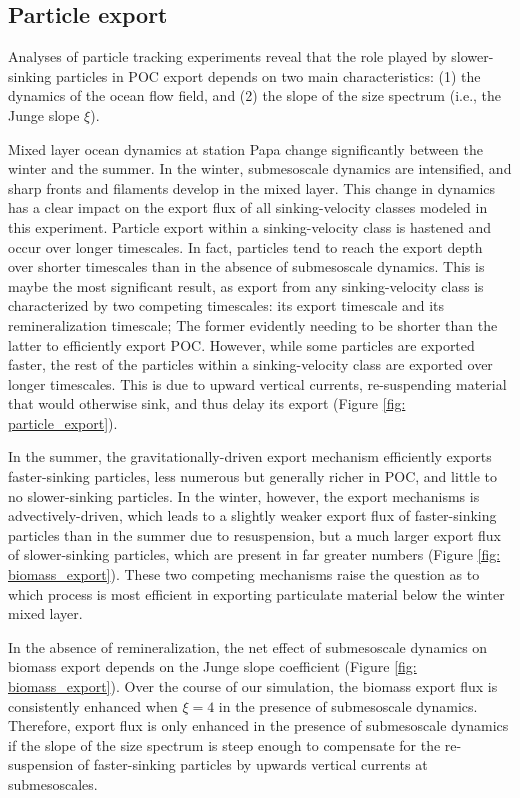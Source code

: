\documentclass[draft,linenumbers]{agujournal2018}
\begin{document}
\subsection{Particle export}
\label{sec: discussion_particle}

Analyses of particle tracking experiments reveal that the role played by slower-sinking particles in POC export depends on two main characteristics: (1) the dynamics of the ocean flow field, and (2) the slope of the size spectrum (i.e., the Junge slope $\xi$).

Mixed layer ocean dynamics at station Papa change significantly between the winter and the summer. In the winter, submesoscale dynamics are intensified, and sharp fronts and filaments develop in the mixed layer. This change in dynamics has a clear impact on the export flux of all sinking-velocity classes modeled in this experiment. Particle export within a sinking-velocity class is hastened and occur over longer timescales. In fact, particles tend to reach the export depth over shorter timescales than in the absence of submesoscale dynamics. This is maybe the most significant result, as export from any sinking-velocity class is characterized by two competing timescales: its export timescale and its remineralization timescale; The former evidently needing to be shorter than the latter to efficiently export POC. However, while some particles are exported faster, the rest of the particles within a sinking-velocity class are exported over longer timescales. This is due to upward vertical currents, re-suspending material that would otherwise sink, and thus delay its export (Figure \ref{fig: particle_export}). 

In the summer, the gravitationally-driven export mechanism efficiently exports faster-sinking particles, less numerous but generally richer in POC, and little to no slower-sinking particles. In the winter, however, the export mechanisms is advectively-driven, which leads to a slightly weaker export flux of faster-sinking particles than in the summer due to resuspension, but a much larger export flux of slower-sinking particles, which are present in far greater numbers (Figure \ref{fig: biomass_export}). These two competing mechanisms raise the question as to which process is most efficient in exporting particulate material below the winter mixed layer.

In the absence of remineralization, the net effect of submesoscale dynamics on biomass export depends on the Junge slope coefficient (Figure \ref{fig: biomass_export}). Over the course of our simulation, the biomass export flux is consistently enhanced when $\xi = 4$ in the presence of submesoscale dynamics. Therefore, export flux is only enhanced in the presence of submesoscale dynamics if the slope of the size spectrum is steep enough to compensate for the re-suspension of faster-sinking particles by upwards vertical currents at submesoscales. %
\end{document}
